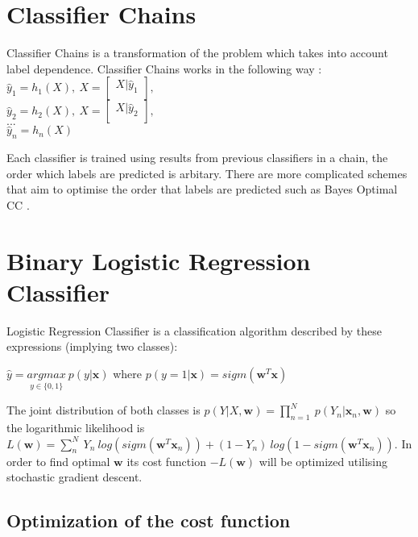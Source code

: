 \documentclass[10pt,letterpaper]{article}
\begin{document}
	\section*{Classifier Chains}
	Classifier Chains is a transformation of the problem which takes into account label dependence. Classifier Chains works in the following way \cite{MLC_finland}:\\ %
	$ 
	\hat{y}_{1} = h_{1}(X) ,  	\ 
	X = 	
	\begin{bmatrix}
		X	| \hat{y}_{1} \\
	\end{bmatrix}
	,$\\
	
	$ \hat{y}_{2} = h_{2}(X) ,  	\ 
	X = 	
	\begin{bmatrix}
	X	| \hat{y}_{2} \\
	\end{bmatrix} 
	,$
	\\
	$  	
	...  
	$
	\\
	$\hat{y}_{n} = h_{n}(X) $
	\newline
	
	Each classifier is trained using results from previous classifiers in a chain, the order which labels are predicted is %
	arbitary. There are more complicated schemes that aim to optimise the order that labels are predicted such as Bayes Optimal CC \cite{MLC_finland}.
	
	\section*{Binary Logistic Regression Classifier}
	Logistic Regression Classifier is a  classification algorithm described by these expressions (implying two classes): 
	
	$ \hat{y} = \underset{y \in \{0,1\} }{argmax}\  p(y|\textbf{x})
	$
	 where $
	 p(y = 1 | \textbf{x} )= sigm(\textbf{w}^T \textbf{x} )
	 $
	
	The joint distribution of both classes is $p(Y |X,\textbf{w}) = \prod_{n=1}^{N} \ p(Y_{n} | \textbf{x}_{n}, \textbf{w} )$
	 so the logarithmic likelihood is $
	 L(\textbf{w}) = \sum_{n}^{N} \ Y_n \ log(sigm(\textbf{w}^T \textbf{x}_n)) + (1-Y_n)\ log(1 - sigm(\textbf{w}^T \textbf{x}_n))
	 $.
	 In order to find optimal $\textbf{w}$ its cost function $-L(\textbf{w})$ will be optimized utilising stochastic gradient descent.
	 
	 \subsection*{Optimization of the cost function}
	 
\end{document}
